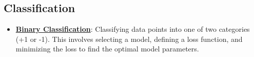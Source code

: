 \documentclass{article}%
\begin{document}
%
\subsection{Classification}%
\label{subsec:Classification}%
\begin{itemize}[leftmargin=*]%
\item \href{https://purdue.brightspace.com/d2l/common/assets/pdfjs-d2l-dist/1.0.14-legacy/web/viewer.html?file=\%2Fcontent\%2Fenforced\%2F1095467-wl.202510.CS.24300.001\%2F05L2-ML Basics.pdf\%3Fou\%3D1095467\&lang=en-us\&container=d2l-fileviewer-rendered-pdf\&fullscreen=d2l-fileviewer-rendered-pdf-dialog\&height=667#page=20}{\textbf{Binary Classification}}: Classifying data points into one of two categories (+1 or -1). This involves selecting a model, defining a loss function, and minimizing the loss to find the optimal model parameters.%
\end{itemize}

%
\end{document}
